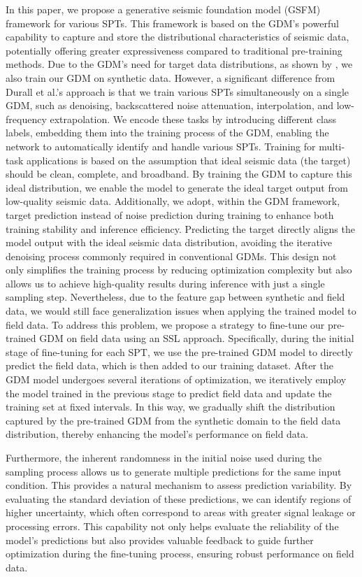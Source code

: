 In this paper, we propose a generative seismic foundation model (GSFM) framework for various SPTs. This framework is based on the GDM's powerful capability to capture and store the distributional characteristics of seismic data, potentially offering greater expressiveness compared to traditional pre-training methods. Due to the GDM's need for target data distributions, as shown by \cite{durall2023deep}, we also train our GDM on synthetic data. However, a significant difference from Durall et al.'s approach is that we train various SPTs simultaneously on a single GDM, such as denoising, backscattered noise attenuation, interpolation, and low-frequency extrapolation. We encode these tasks by introducing different class labels, embedding them into the training process of the GDM, enabling the network to automatically identify and handle various SPTs. Training for multi-task  applications is based on the assumption that ideal seismic data (the target) should be clean, complete, and broadband. By training the GDM to capture this ideal distribution, we enable the model to generate the ideal target output from low-quality seismic data. Additionally, we adopt, within the GDM framework, target prediction instead of noise prediction during training to enhance both training stability and inference efficiency. Predicting the target directly aligns the model output with the ideal seismic data distribution, avoiding the iterative denoising process commonly required in conventional GDMs. This design not only simplifies the training process by reducing optimization complexity but also allows us to achieve high-quality results during inference with just a single sampling step. Nevertheless, due to the feature gap between synthetic and field data, we would still face generalization issues when applying the trained model to field data. To address this problem, we propose a strategy to fine-tune our pre-trained GDM on field data using an SSL approach. Specifically, during the initial stage of fine-tuning for each SPT, we use the pre-trained GDM model to directly predict the field data, which is then added to our training dataset. After the GDM model undergoes several iterations of optimization, we iteratively employ the model trained in the previous stage to predict field data and update the training set at fixed intervals. In this way, we gradually shift the distribution captured by the pre-trained GDM from the synthetic domain to the field data distribution, thereby enhancing the model's performance on field data. 

Furthermore, the inherent randomness in the initial noise used during the sampling process allows us to generate multiple predictions for the same input condition. This provides a natural mechanism to assess prediction variability. By evaluating the standard deviation of these predictions, we can identify regions of higher uncertainty, which often correspond to areas with greater signal leakage or processing errors. This capability not only helps evaluate the reliability of the model's predictions but also provides valuable feedback to guide further optimization during the fine-tuning process, ensuring robust performance on field data. 


